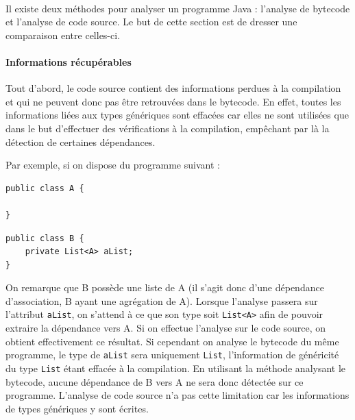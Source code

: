 \documentclass{scrartcl}
\begin{document}
    \paragraph{} Il existe deux méthodes pour analyser un programme Java : l'analyse de bytecode et l'analyse de code source. Le but de cette section est de dresser une comparaison entre celles-ci.
    
    \paragraph{Informations récupérables} Tout d'abord, le code source contient des informations perdues à la compilation et qui ne peuvent donc pas être retrouvées dans le bytecode. En effet, toutes les informations liées aux types génériques sont effacées car elles ne sont utilisées que dans le but d'effectuer des vérifications à la compilation, empêchant par là la détection de certaines dépendances.
    
    Par exemple, si on dispose du programme suivant :
    
    \begin{minipage}{(\textwidth/2) - 0.6cm}
        \begin{lstlisting}
public class A {

}
        \end{lstlisting}
    \end{minipage}
    \hspace{0.5cm}
    \begin{minipage}{(\textwidth/2) - 0.6cm}
        \begin{lstlisting}
public class B {
    private List<A> aList;
}
        \end{lstlisting}
    \end{minipage}
    
    On remarque que B possède une liste de A (il s'agit donc d'une dépendance d'association, B ayant une agrégation de A). Lorsque l'analyse passera sur l'attribut \texttt{aList}, on s'attend à ce que son type soit \texttt{List<A>} afin de pouvoir extraire la dépendance vers A. Si on effectue l'analyse sur le code source, on obtient effectivement ce résultat. Si cependant on analyse le bytecode du même programme, le type de \texttt{aList} sera uniquement \texttt{List}, l'information de généricité du type \texttt{List} étant effacée à la compilation. En utilisant la méthode analysant le bytecode, aucune dépendance de B vers A ne sera donc détectée sur ce programme. L'analyse de code source n'a pas cette limitation car les informations de types génériques y sont écrites.
    
\end{document}
